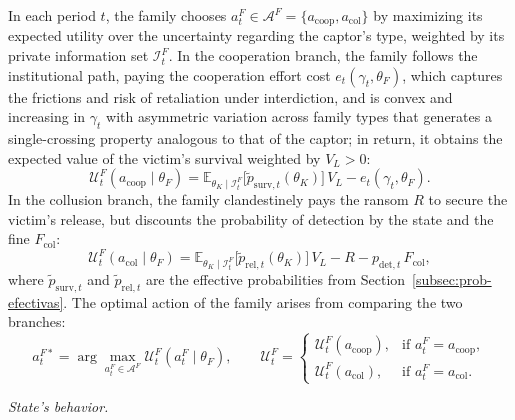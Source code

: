 \documentclass[pdflatex,sn-mathphys-ay]{sn-jnl}
\theoremstyle{plain}
\theoremstyle{definition}
\newcommand{\E}{\mathbb{E}}
\newcommand{\1}{\mathbf{1}}
\begin{document}
\noindent In each period $t$, the family chooses $a_t^F\in\mathcal{A}^F=\{a_{\mathrm{coop}},a_{\mathrm{col}}\}$ by maximizing its expected utility over the uncertainty regarding the captor's type, weighted by its private information set $\mathcal{I}_t^F$. In the cooperation branch, the family follows the institutional path, paying the cooperation effort cost $e_t(\gamma_t,\theta_F)$, which captures the frictions and risk of retaliation under interdiction, and is convex and increasing in $\gamma_t$ with asymmetric variation across family types that generates a single-crossing property analogous to that of the captor; in return, it obtains the expected value of the victim's survival weighted by $V_L>0$:
\begin{equation}
\mathcal{U}^F_t(a_{\mathrm{coop}}\mid\theta_F)=\E_{\theta_K\mid\mathcal{I}_t^F}\!\bigl[\tilde{p}_{\mathrm{surv},t}(\theta_K)\bigr]\,V_L-e_t(\gamma_t,\theta_F).
\label{eq:f-coop}
\end{equation}
In the collusion branch, the family clandestinely pays the ransom $R$ to secure the victim's release, but discounts the probability of detection by the state and the fine $F_{\mathrm{col}}$:
\begin{equation}
\mathcal{U}^F_t(a_{\mathrm{col}}\mid\theta_F)=\E_{\theta_K\mid\mathcal{I}_t^F}\!\bigl[\tilde{p}_{\mathrm{rel},t}(\theta_K)\bigr]\,V_L-R-p_{\mathrm{det},t}\,F_{\mathrm{col}},
\label{eq:f-col}
\end{equation}
where $\tilde{p}_{\mathrm{surv},t}$ and $\tilde{p}_{\mathrm{rel},t}$ are the effective probabilities from Section~\ref{subsec:prob-efectivas}. The optimal action of the family arises from comparing the two branches:
\begin{equation}
a_t^{F\ast}=\arg\max_{a_t^F\in\mathcal{A}^F}\mathcal{U}^F_t(a_t^F\mid\theta_F),\qquad
\mathcal{U}^F_t=\begin{cases}\mathcal{U}^F_t(a_{\mathrm{coop}}), & \text{if }a_t^F=a_{\mathrm{coop}},\\\mathcal{U}^F_t(a_{\mathrm{col}}), & \text{if }a_t^F=a_{\mathrm{col}}.\end{cases}
\label{eq:f-argmax}
\end{equation}

\noindent\textit{State's behavior.}
\end{document}
